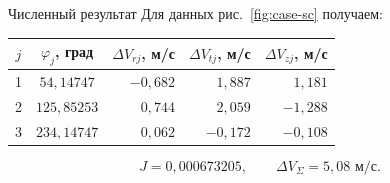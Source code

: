 \begin{explanation}{Численный результат}
Для данных рис.~\ref{fig:case-sc} получаем:
\begin{center}\begin{tabular}{cc|rrr}
$j$ & $\varphi_j$, град & $\Delta V_{rj}$, м/с & $\Delta V_{tj}$, м/с & $\Delta V_{zj}$, м/с\\\hline
1 & $54{,}14747$ & $-0{,}682$ & $1{,}887$ & $1{,}181$\\
2 & $125{,}85253$ & $0{,}744$ & $2{,}059$ & $-1{,}288$\\
3 & $234{,}14747$ & $0{,}062$ & $-0{,}172$ & $-0{,}108$\\
\end{tabular}\end{center}
\[ J=0{,}000673205,\qquad \Delta V_\Sigma=5{,}08\text{ м/с}.\]
\end{explanation}
